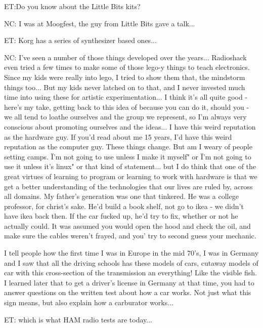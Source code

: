 ET:Do you know about the Little Bits kits? 

NC: I was at Moogfest, the guy from Little Bits gave a talk... 

ET: Korg has a series of synthesizer based ones... 

NC: I've seen a number of those things developed over the years... Radioshack even tried a few times to make some of those lego-y things to teach electronics. Since my kids were really into lego, I tried to show them that, the mindstorm things too... But my kids never latched on to that, and I never invested much time into using these for artistic experimentation... I think it's all quite good - here's my take, getting back to this idea of because you can do it, should you - we all tend to loathe ourselves and the group we represent, so I'm always very conscious about promoting ourselves and the ideas... I have this weird reputation as the hardware guy. If you'd read about me 15 years, I'd have this weird reputation as the computer guy. These things change. But am I weary of people setting camps. \"I'm not going to use unless I make it myself" or \"I'm not going to use it unless it's linux" or that kind of statement... but I do think that one of the great virtues of learning to program or learning to work with hardware is that we get a better understanding of the technologies that our lives are ruled by, across all domains. My father's generation was one that tinkered. He was a college professor, for christ's sake. He'd build a book shelf, not go to ikea - we didn't have ikea back then. If the car fucked up, he'd try to fix, whether or not he actually could. It was assumed you would open the hood and check the oil, and make sure the cables weren't frayed, and you' try to second guess your mechanic. 

I tell people how the first time I was in Europe in the mid 70's, I was in Germany and I saw that all the driving schools has these models of cars, cutaway models of car with this cross-section of the transmission an everything! Like the visible fish. I learned later that to get a driver's license in Germany at that time, you had to answer questions on the written test about how a car works. Not just what this sign means, but also explain how a carburator works... 

ET: which is what HAM radio tests are today... 

